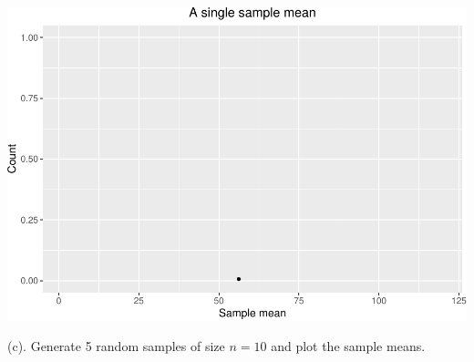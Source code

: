 \documentclass[
]{book}
\begin{document}
\includegraphics[width=1\linewidth]{Class_Activity_7_files/figure-latex/unnamed-chunk-16-1}

(c). Generate 5 random samples of size \(n= 10\) and plot the sample means.
\end{document}
